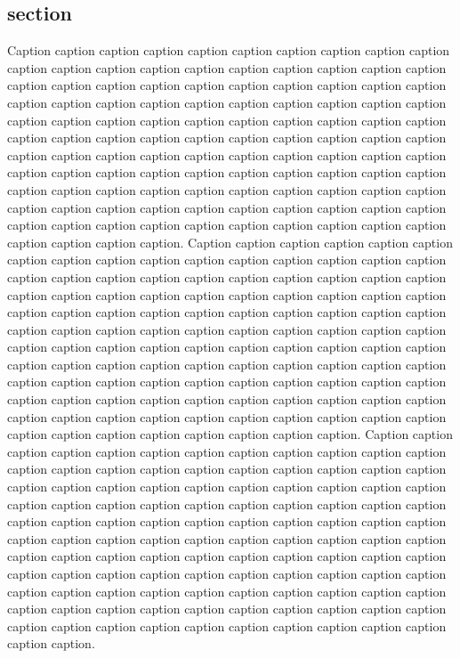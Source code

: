 \subsection{section}
Caption caption caption caption caption caption caption caption caption caption caption caption caption caption caption caption caption caption caption caption caption caption caption caption caption caption caption caption caption caption caption caption caption caption caption caption caption caption caption caption caption caption caption caption caption caption caption caption caption caption caption caption caption caption caption caption caption caption caption caption caption caption caption caption caption caption caption caption caption caption caption caption caption caption caption caption caption caption caption caption caption caption caption caption caption caption caption caption caption caption caption caption caption caption caption caption caption caption caption caption caption caption caption caption caption caption caption caption caption caption caption caption caption caption. Caption caption caption caption caption caption caption caption caption caption caption caption caption caption caption caption caption caption caption caption caption caption caption caption caption caption caption caption caption caption caption caption caption caption caption caption caption caption caption caption caption caption caption caption caption caption caption caption caption caption caption caption caption caption caption caption caption caption caption caption caption caption caption caption caption caption caption caption caption caption caption caption caption caption caption caption caption caption caption caption caption caption caption caption caption caption caption caption caption caption caption caption caption caption caption caption caption caption caption caption caption caption caption caption caption caption caption caption caption caption caption caption caption caption. Caption caption caption caption caption caption caption caption caption caption caption caption caption caption caption caption caption caption caption caption caption caption caption caption caption caption caption caption caption caption caption caption caption caption caption caption caption caption caption caption caption caption caption caption caption caption caption caption caption caption caption caption caption caption caption caption caption caption caption caption caption caption caption caption caption caption caption caption caption caption caption caption caption caption caption caption caption caption caption caption caption caption caption caption caption caption caption caption caption caption caption caption caption caption caption caption caption caption caption caption caption caption caption caption caption caption caption caption caption caption caption caption caption caption. 

